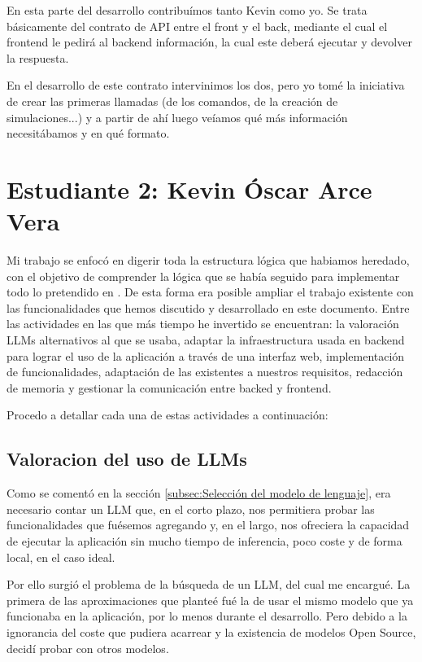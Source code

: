 En esta parte del desarrollo contribuímos tanto Kevin como yo. Se trata básicamente del contrato de API entre el front y el back, mediante el cual el frontend le pedirá al backend información, la cual este deberá ejecutar y devolver la respuesta.

En el desarrollo de este contrato intervinimos los dos, pero yo tomé la iniciativa de crear las primeras llamadas (de los comandos, de la creación de simulaciones...) y a partir de ahí luego veíamos qué más información necesitábamos y en qué formato.

\section*{Estudiante 2: Kevin Óscar Arce Vera}

Mi trabajo se enfocó en digerir toda la estructura lógica que habiamos heredado, con el objetivo de comprender la lógica que se había seguido para implementar todo lo pretendido en \cite{park2023generative}. De esta forma era posible ampliar el trabajo existente con las funcionalidades que hemos discutido y desarrollado en este documento. Entre las actividades en las que más tiempo he invertido se encuentran: la valoración LLMs alternativos al que se usaba,  adaptar la infraestructura usada en backend para lograr el uso de la aplicación a través de una interfaz web, implementación de funcionalidades, adaptación de las existentes a nuestros requisitos, redacción de memoria y gestionar la comunicación entre backed y frontend.

Procedo a detallar cada una de estas actividades a continuación:

\subsection*{Valoracion del uso de LLMs}

Como se comentó en la sección \ref{subsec:Selección del modelo de lenguaje}, era necesario contar un LLM que, en el corto plazo, nos permitiera probar las funcionalidades que fuésemos agregando y, en el largo, nos ofreciera la capacidad de ejecutar la aplicación sin mucho tiempo de inferencia, poco coste y de forma local, en el caso ideal.

Por ello surgió el problema de la búsqueda de un LLM, del cual me encargué. La primera de las aproximaciones que planteé fué la de usar el mismo modelo que ya funcionaba en la aplicación, por lo menos durante el desarrollo. Pero debido a la ignorancia del coste que pudiera acarrear y la existencia de modelos Open Source, decidí probar con otros modelos.

